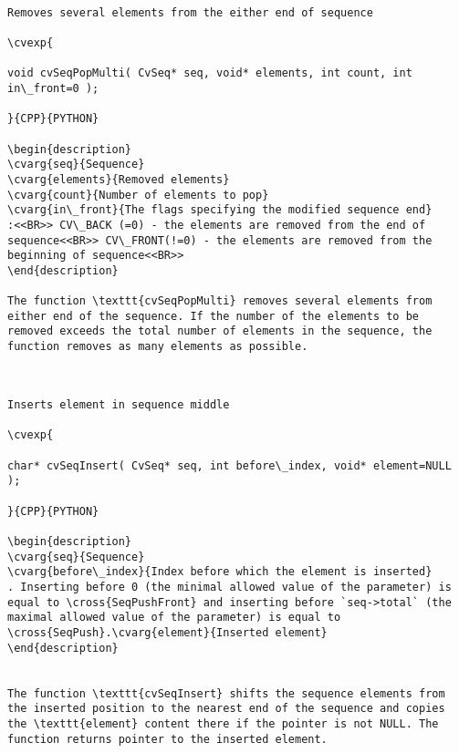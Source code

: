 \begin{verbatim}

Removes several elements from the either end of sequence

\cvexp{

void cvSeqPopMulti( CvSeq* seq, void* elements, int count, int in\_front=0 );

}{CPP}{PYTHON}

\begin{description}
\cvarg{seq}{Sequence}
\cvarg{elements}{Removed elements}
\cvarg{count}{Number of elements to pop}
\cvarg{in\_front}{The flags specifying the modified sequence end}
:<<BR>> CV\_BACK (=0) - the elements are removed from the end of sequence<<BR>> CV\_FRONT(!=0) - the elements are removed from the beginning of sequence<<BR>>
\end{description}

The function \texttt{cvSeqPopMulti} removes several elements from either end of the sequence. If the number of the elements to be removed exceeds the total number of elements in the sequence, the function removes as many elements as possible.


\end{verbatim}
\begin{verbatim}

Inserts element in sequence middle

\cvexp{

char* cvSeqInsert( CvSeq* seq, int before\_index, void* element=NULL );

}{CPP}{PYTHON}

\begin{description}
\cvarg{seq}{Sequence}
\cvarg{before\_index}{Index before which the element is inserted}
. Inserting before 0 (the minimal allowed value of the parameter) is equal to \cross{SeqPushFront} and inserting before `seq->total` (the maximal allowed value of the parameter) is equal to \cross{SeqPush}.\cvarg{element}{Inserted element}
\end{description}


The function \texttt{cvSeqInsert} shifts the sequence elements from the inserted position to the nearest end of the sequence and copies the \texttt{element} content there if the pointer is not NULL. The function returns pointer to the inserted element.


\end{verbatim}
